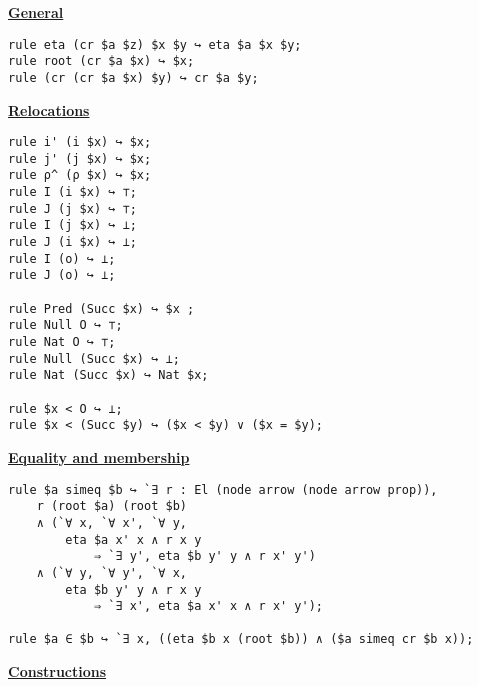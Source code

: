 \documentclass[a4paper]{article}
\begin{document}
\begin{center}
\underline{\textbf{General}}
\end{center}

\begin{lstlisting}
rule eta (cr $a $z) $x $y ↪ eta $a $x $y;
rule root (cr $a $x) ↪ $x;
rule (cr (cr $a $x) $y) ↪ cr $a $y;
\end{lstlisting}

\begin{center}
\underline{\textbf{Relocations}}
\end{center}

\begin{lstlisting}
rule i' (i $x) ↪ $x;
rule j' (j $x) ↪ $x;
rule ρ^ (ρ $x) ↪ $x;
rule I (i $x) ↪ ⊤;
rule J (j $x) ↪ ⊤;
rule I (j $x) ↪ ⊥;
rule J (i $x) ↪ ⊥;
rule I (o) ↪ ⊥;
rule J (o) ↪ ⊥;

rule Pred (Succ $x) ↪ $x ;
rule Null O ↪ ⊤;
rule Nat O ↪ ⊤;
rule Null (Succ $x) ↪ ⊥;
rule Nat (Succ $x) ↪ Nat $x;

rule $x < O ↪ ⊥;
rule $x < (Succ $y) ↪ ($x < $y) ∨ ($x = $y);
\end{lstlisting}

\begin{center}
\underline{\textbf{Equality and membership}}
\end{center}

\begin{lstlisting}
rule $a simeq $b ↪ `∃ r : El (node arrow (node arrow prop)), 
    r (root $a) (root $b)
    ∧ (`∀ x, `∀ x', `∀ y, 
        eta $a x' x ∧ r x y
            ⇒ `∃ y', eta $b y' y ∧ r x' y')
    ∧ (`∀ y, `∀ y', `∀ x, 
        eta $b y' y ∧ r x y
            ⇒ `∃ x', eta $a x' x ∧ r x' y');

rule $a ∈ $b ↪ `∃ x, ((eta $b x (root $b)) ∧ ($a simeq cr $b x));
\end{lstlisting}

\begin{center}
\underline{\textbf{Constructions}}
\end{center}
\end{document}

